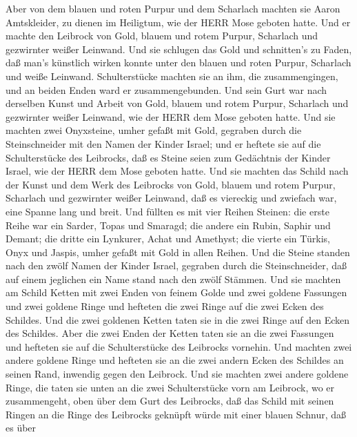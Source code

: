  Aber von dem blauen und roten Purpur und dem Scharlach
machten sie Aaron Amtskleider, zu dienen im Heiligtum, wie der HERR Mose
geboten hatte.  Und er machte den Leibrock von Gold, blauem
und rotem Purpur, Scharlach und gezwirnter weißer Leinwand. 
Und sie schlugen das Gold und schnitten's zu Faden, daß man's künstlich
wirken konnte unter den blauen und roten Purpur, Scharlach und weiße
Leinwand.  Schulterstücke machten sie an ihm, die
zusammengingen, und an beiden Enden ward er zusammengebunden.
 Und sein Gurt war nach derselben Kunst und Arbeit von Gold,
blauem und rotem Purpur, Scharlach und gezwirnter weißer Leinwand, wie
der HERR dem Mose geboten hatte.  Und sie machten zwei
Onyxsteine, umher gefaßt mit Gold, gegraben durch die Steinschneider mit
den Namen der Kinder Israel;  und er heftete sie auf die
Schulterstücke des Leibrocks, daß es Steine seien zum Gedächtnis der
Kinder Israel, wie der HERR dem Mose geboten hatte.  Und sie
machten das Schild nach der Kunst und dem Werk des Leibrocks von Gold,
blauem und rotem Purpur, Scharlach und gezwirnter weißer Leinwand,
 daß es viereckig und zwiefach war, eine Spanne lang und
breit.  Und füllten es mit vier Reihen Steinen: die erste
Reihe war ein Sarder, Topas und Smaragd;  die andere ein
Rubin, Saphir und Demant;  die dritte ein Lynkurer, Achat
und Amethyst;  die vierte ein Türkis, Onyx und Jaspis,
umher gefaßt mit Gold in allen Reihen.  Und die Steine
standen nach den zwölf Namen der Kinder Israel, gegraben durch die
Steinschneider, daß auf einem jeglichen ein Name stand nach den zwölf
Stämmen.  Und sie machten am Schild Ketten mit zwei Enden
von feinem Golde  und zwei goldene Fassungen und zwei
goldene Ringe und hefteten die zwei Ringe auf die zwei Ecken des
Schildes.  Und die zwei goldenen Ketten taten sie in die
zwei Ringe auf den Ecken des Schildes.  Aber die zwei Enden
der Ketten taten sie an die zwei Fassungen und hefteten sie auf die
Schulterstücke des Leibrocks vornehin.  Und machten zwei
andere goldene Ringe und hefteten sie an die zwei andern Ecken des
Schildes an seinen Rand, inwendig gegen den Leibrock.  Und
sie machten zwei andere goldene Ringe, die taten sie unten an die zwei
Schulterstücke vorn am Leibrock, wo er zusammengeht, oben über dem Gurt
des Leibrocks,  daß das Schild mit seinen Ringen an die
Ringe des Leibrocks geknüpft würde mit einer blauen Schnur, daß es über
